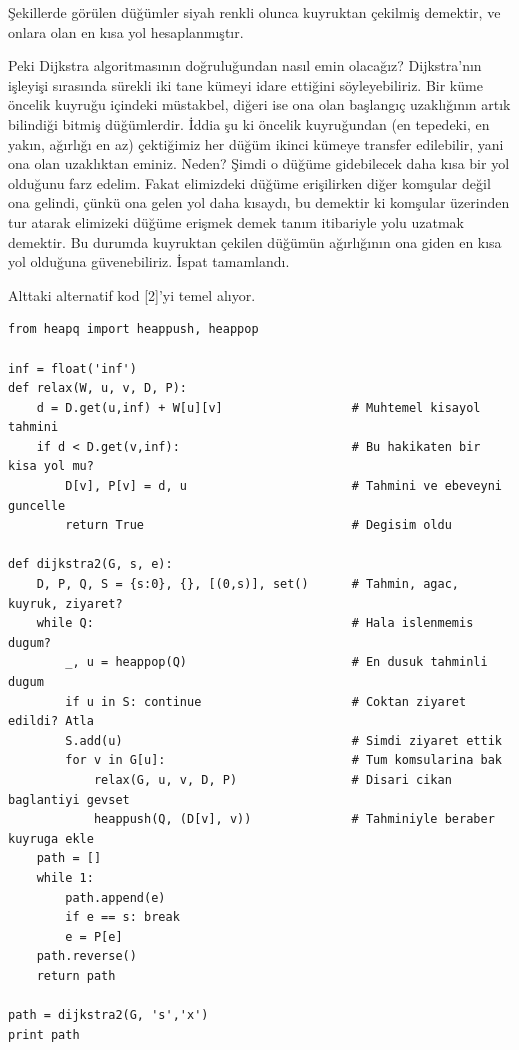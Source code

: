 \documentclass[12pt,fleqn]{article}\usepackage{../../common}
\begin{document}
Şekillerde görülen düğümler siyah renkli olunca  kuyruktan çekilmiş
demektir, ve onlara olan en kısa yol hesaplanmıştır. 

Peki Dijkstra algoritmasının doğruluğundan nasıl emin olacağız?
Dijkstra'nın işleyişi sırasında sürekli iki tane kümeyi idare ettiğini
söyleyebiliriz. Bir küme öncelik kuyruğu içindeki müstakbel, diğeri ise ona
olan başlangıç uzaklığının artık bilindiği bitmiş düğümlerdir. İddia şu ki
öncelik kuyruğundan (en tepedeki, en yakın, ağırlığı en az) çektiğimiz her
düğüm ikinci kümeye transfer edilebilir, yani ona olan uzaklıktan
eminiz. Neden? Şimdi o düğüme gidebilecek daha kısa bir yol olduğunu farz
edelim. Fakat elimizdeki düğüme erişilirken diğer komşular değil ona
gelindi, çünkü ona gelen yol daha kısaydı, bu demektir ki komşular
üzerinden tur atarak elimizeki düğüme erişmek demek tanım itibariyle yolu
uzatmak demektir. Bu durumda kuyruktan çekilen düğümün ağırlığının ona
giden en kısa yol olduğuna güvenebiliriz. İspat tamamlandı.

Alttaki alternatif kod [2]'yi temel alıyor.

\begin{verbatim}
from heapq import heappush, heappop

inf = float('inf')
def relax(W, u, v, D, P):
    d = D.get(u,inf) + W[u][v]                  # Muhtemel kisayol tahmini
    if d < D.get(v,inf):                        # Bu hakikaten bir kisa yol mu?
        D[v], P[v] = d, u                       # Tahmini ve ebeveyni guncelle
        return True                             # Degisim oldu

def dijkstra2(G, s, e):
    D, P, Q, S = {s:0}, {}, [(0,s)], set()      # Tahmin, agac, kuyruk, ziyaret?
    while Q:                                    # Hala islenmemis dugum?
        _, u = heappop(Q)                       # En dusuk tahminli dugum
        if u in S: continue                     # Coktan ziyaret edildi? Atla
        S.add(u)                                # Simdi ziyaret ettik
        for v in G[u]:                          # Tum komsularina bak
            relax(G, u, v, D, P)                # Disari cikan baglantiyi gevset
            heappush(Q, (D[v], v))              # Tahminiyle beraber kuyruga ekle
    path = []
    while 1:
        path.append(e)
        if e == s: break
        e = P[e]
    path.reverse()
    return path

path = dijkstra2(G, 's','x')
print path
\end{verbatim}
\end{document}
